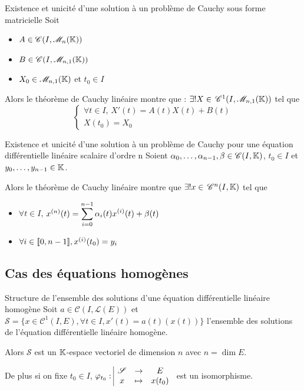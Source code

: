 \begin{corollairent}{Existence et unicité d'une solution à un problème de Cauchy sous forme matricielle}{}
    Soit 
    \begin{itemize}
        \item $A \in \mathscr C(I, \mathscr M_n(\mathbb{K}))$
        \item $B \in \mathscr C(I, \mathscr M_{n,1}(\mathbb{K}))$
        \item $X_0 \in \mathscr M_{n,1}(\mathbb{K})$ et $t_0 \in I$
    \end{itemize}

    Alors le théorème de Cauchy linéaire montre que :  
    $\exists ! X \in \,\mathscr C^{1}(I, \mathscr M_{n,1}(\mathbb{K}))$ tel que 
    $$\begin{cases}
        \forall t \in I, \, X'(t) = A(t) X(t) + B(t) \\
        X(t_0) = X_0
    \end{cases}$$
\end{corollairent}

\begin{theorement}{Existence et unicité d'une solution à un problème de Cauchy pour une équation différentielle linéaire scalaire d'ordre n}{}
    Soient $\alpha_0, \dots, \alpha_{n-1}, \beta \in \mathscr C(I, \mathbb{K})$, $t_0 \in I$ et $y_0, \dots, y_{n-1} \in \mathbb{K}$.

    Alors le théorème de Cauchy linéaire montre que $\exists ! x \in \,\mathscr C^{n} (I, \mathbb{K})$ 
    tel que 
    
    \begin{itemize}
        \item $\forall t \in I$, $x^{(n)}(t) = \displaystyle \sum_{i = 0}^{n - 1} \alpha_i(t) x^{(i)}(t) + \beta(t)$
        \item $\forall i \in [\![0, n - 1]\!], x^{(i)}(t_0) = y_i$
    \end{itemize} 
\end{theorement}

\subsection{Cas des équations homogènes}


\lvspace \avspace \begin{theorement}{Structure de l'ensemble des solutions d'une équation différentielle linéaire homogène}{}
    Soit $a \in \mathscr C(I, \mathscr L(E))$ et $\mathscr S = \{ x \in \mathscr C^1(I, E), \forall t \in I, x'(t) = a(t)(x(t)) \}$ 
    l'ensemble des solutions de l'équation différentielle linéaire homogène.

    Alors $\mathscr S$ est un $\mathbb{K}$-espace vectoriel de dimension $n$ avec $n = \dim E$. 

    De plus si on fixe $t_0 \in I$, $\varphi_{t_0}: \space \begin{array}{|ccc} \displaystyle \mathscr S & \to & \displaystyle E \\ \displaystyle x & \mapsto & \displaystyle x(t_0) \end{array}$ est un isomorphisme. 
\end{theorement}

